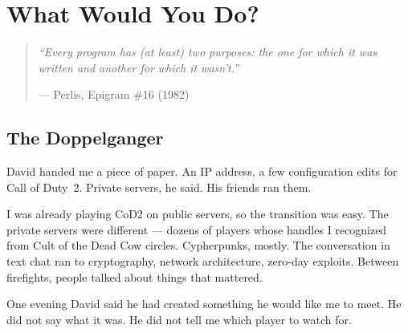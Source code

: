 
\chapter{What Would You Do?}
\label{pos35:the-question}

\begin{quote}\small\textit{%
``Every program has (at least) two purposes: the one for which it was written and another for which it wasn't.''%
}\par\raggedleft --- Perlis, Epigram \#16 (1982)\end{quote}

\vspace{0.5cm}


\section*{The Doppelganger}
\label{pos35:the-doppelganger}


\noindent David handed me a piece of paper. An IP address, a few configuration edits for Call of Duty~2. Private servers, he said. His friends ran them.

I was already playing CoD2 on public servers, so the transition was easy. The private servers were different --- dozens of players whose handles I recognized from Cult of the Dead Cow circles. Cypherpunks, mostly. The conversation in text chat ran to cryptography, network architecture, zero-day exploits. Between firefights, people talked about things that mattered.

One evening David said he had created something he would like me to meet. He did not say what it was. He did not tell me which player to watch for.

